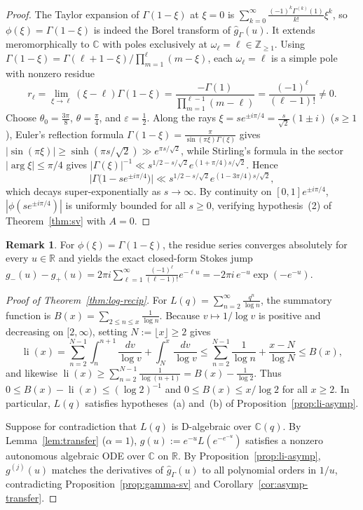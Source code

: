 \documentclass[10pt,reqno]{amsart}
\numberwithin{equation}{section}
\theoremstyle{definition}
\newtheorem{remark}[proposition]{Remark}
\newcommand{\Z}{\mathbb{Z}}
\newcommand{\R}{\mathbb{R}}
\newcommand{\C}{\mathbb{C}}
\DeclareMathOperator{\li}{li}
\begin{document}
\begin{proof}
The Taylor expansion of $\Gamma(1 - \xi)$ at $\xi = 0$ is $\sum_{k=0}^\infty \frac{(-1)^k \Gamma^{(k)}(1)}{k!}\xi^k$, so $\phi(\xi) = \Gamma(1 - \xi)$ is indeed the Borel transform of $\widehat{g}_\Gamma(u)$. It extends meromorphically to $\C$ with poles exclusively at $\omega_\ell = \ell \in \Z_{\ge 1}$. Using $\Gamma(1 - \xi) = \Gamma(\ell + 1 - \xi) / \prod_{m=1}^\ell (m - \xi)$, each $\omega_\ell = \ell$ is a simple pole with nonzero residue
\[
  r_\ell = \lim_{\xi \to \ell} (\xi - \ell)\Gamma(1 - \xi)
  = \frac{-\Gamma(1)}{\prod_{m=1}^{\ell - 1}(m - \ell)} = \frac{(-1)^\ell}{(\ell - 1)!} \neq 0.
\]
Choose $\theta_0 = \frac{3\pi}{8}$, $\theta = \frac{\pi}{4}$, and $\varepsilon = \frac{1}{2}$. Along the rays $\xi = s e^{\pm i\pi/4} = \frac{s}{\sqrt{2}}(1 \pm i)$ ($s \ge 1$), Euler's reflection formula $\Gamma(1-\xi) = \frac{\pi}{\sin(\pi\xi)\Gamma(\xi)}$ gives $|\sin(\pi\xi)| \ge \sinh(\pi s/\sqrt{2}) \gg e^{\pi s/\sqrt{2}}$, while Stirling's formula in the sector $|\arg\xi| \le \pi/4$ gives $|\Gamma(\xi)|^{-1} \ll s^{1/2 - s/\sqrt{2}} e^{(1 + \pi/4)s/\sqrt{2}}$. Hence
\[
  \bigl|\Gamma\bigl(1 - s e^{\pm i\pi/4}\bigr)\bigr| \ll s^{1/2 - s/\sqrt{2}} e^{(1 - 3\pi/4)s/\sqrt{2}},
\]
which decays super-exponentially as $s \to \infty$. By continuity on $[0, 1] e^{\pm i\pi/4}$, $|\phi(s e^{\pm i\pi/4})|$ is uniformly bounded for all $s \ge 0$, verifying hypothesis~(2) of Theorem~\ref{thm:sv} with $A = 0$.
\end{proof}

\begin{remark}
For $\phi(\xi) = \Gamma(1-\xi)$, the residue series converges absolutely for every $u \in \R$ and yields the exact closed-form Stokes jump $g_-(u) - g_+(u) = 2\pi i \sum_{\ell=1}^\infty \frac{(-1)^\ell}{(\ell-1)!} e^{-\ell u} = -2\pi i\, e^{-u} \exp(-e^{-u})$.
\end{remark}

\begin{proof}[Proof of Theorem~\ref{thm:log-recip}]
For $L(q) = \sum_{n=2}^\infty \frac{q^n}{\log n}$, the summatory function is $B(x) = \sum_{2 \le n \le x} \frac{1}{\log n}$. Because $v \mapsto 1/\log v$ is positive and decreasing on $[2,\infty)$, setting $N := \lfloor x \rfloor \ge 2$ gives
\[
  \li(x) = \sum_{n=2}^{N-1} \int_n^{n+1} \frac{dv}{\log v} + \int_N^x \frac{dv}{\log v}
  \le \sum_{n=2}^{N-1} \frac{1}{\log n} + \frac{x - N}{\log N} \le B(x),
\]
and likewise $\li(x) \ge \sum_{n=2}^{N-1} \frac{1}{\log(n+1)} = B(x) - \frac{1}{\log 2}$. Thus $0 \le B(x) - \li(x) \le (\log 2)^{-1}$ and $0 \le B(x) \le x/\log 2$ for all $x \ge 2$. In particular, $L(q)$ satisfies hypotheses~(a) and~(b) of Proposition~\ref{prop:li-asymp}.

Suppose for contradiction that $L(q)$ is D-algebraic over $\C(q)$. By Lemma~\ref{lem:transfer} ($\alpha = 1$), $g(u) := e^{-u} L(e^{-e^{-u}})$ satisfies a nonzero autonomous algebraic ODE over $\C$ on $\R$. By Proposition~\ref{prop:li-asymp}, $g^{(j)}(u)$ matches the derivatives of $\widehat{g}_\Gamma(u)$ to all polynomial orders in $1/u$, contradicting Proposition~\ref{prop:gamma-sv} and Corollary~\ref{cor:asymp-transfer}.
\end{proof}
\end{document}
